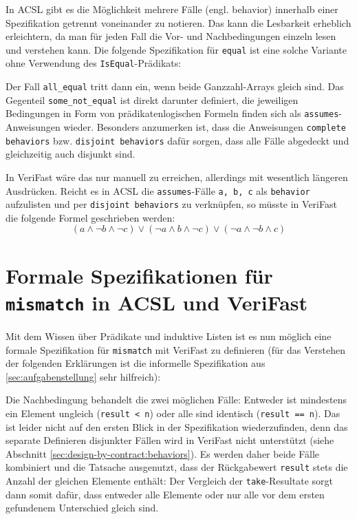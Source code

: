 In ACSL gibt es die Möglichkeit mehrere Fälle (engl. behavior) innerhalb einer Spezifikation getrennt voneinander zu
notieren. Das kann die Lesbarkeit erheblich erleichtern, da man für jeden Fall die Vor- und Nachbedingungen
einzeln lesen und verstehen kann.
\newpage
Die folgende Spezifikation für \texttt{equal} ist eine solche Variante ohne Verwendung des 
\lstinline{IsEqual}-Prädikats:



Der Fall \lstinline{all_equal} tritt dann ein, wenn beide Ganzzahl-Arrays gleich sind. Das 
Gegenteil \lstinline{some_not_equal} ist direkt darunter definiert, die jeweiligen Bedingungen in Form von
prädikatenlogischen Formeln finden sich als \lstinline{assumes}-Anweisungen wieder. Besonders anzumerken ist,
dass die Anweisungen \lstinline{complete behaviors} bzw. \lstinline{disjoint behaviors} dafür sorgen, dass
alle Fälle abgedeckt und gleichzeitig auch disjunkt sind.

In VeriFast wäre das nur manuell zu erreichen, allerdings mit wesentlich längeren Ausdrücken. Reicht 
es in ACSL die \lstinline{assumes}-Fälle \lstinline{a, b, c} als \lstinline{behavior} 
aufzulisten und per \lstinline{disjoint behaviors} zu verknüpfen, so müsste in VeriFast die folgende
Formel geschrieben werden:
\[(a \land \neg b \land \neg c) \lor (\neg a \land b \land \neg c) \lor (\neg a \land \neg b \land c)\]


\section{Formale Spezifikationen für \texttt{mismatch} in ACSL und VeriFast}

Mit dem Wissen über Prädikate und induktive Listen ist es nun möglich eine formale Spezifikation für \lstinline{mismatch} mit VeriFast
zu definieren (für das Verstehen der folgenden Erklärungen ist die informelle Spezifikation aus 
\ref{sec:aufgabenstellung} sehr hilfreich):
\newpage


Die Nachbedingung behandelt die zwei möglichen Fälle: Entweder ist mindestens ein Element ungleich
(\lstinline{result < n}) oder alle sind identisch (\lstinline{result == n}). Das ist leider nicht auf den
ersten Blick in der Spezifikation wiederzufinden, denn das separate Definieren disjunkter Fällen wird in VeriFast 
nicht unterstützt (siehe Abschnitt \ref{sec:design-by-contract:behaviors}). Es werden daher beide Fälle kombiniert
und die Tatsache ausgenutzt, dass der Rückgabewert \lstinline{result} stets die Anzahl der gleichen Elemente enthält:
Der Vergleich der \lstinline{take}-Resultate sorgt dann somit dafür, dass entweder alle Elemente oder nur
alle vor dem ersten gefundenem Unterschied gleich sind. 

